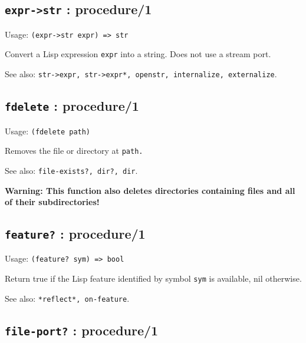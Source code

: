 \documentclass[
]{article}
\newcommand{\passthrough}[1]{#1}
\begin{document}
\hypertarget{expr-str-procedure1-1}{%
\subsection{\texorpdfstring{\texttt{expr-\textgreater{}str} :
procedure/1}{expr-\textgreater str : procedure/1}}\label{expr-str-procedure1-1}}

Usage: \passthrough{\lstinline!(expr->str expr) => str!}

Convert a Lisp expression \passthrough{\lstinline!expr!} into a string.
Does not use a stream port.

See also:
\passthrough{\lstinline!str->expr, str->expr*, openstr, internalize, externalize!}.

\hypertarget{fdelete-procedure1-1}{%
\subsection{\texorpdfstring{\texttt{fdelete} :
procedure/1}{fdelete : procedure/1}}\label{fdelete-procedure1-1}}

Usage: \passthrough{\lstinline!(fdelete path)!}

Removes the file or directory at \passthrough{\lstinline!path.!}

See also: \passthrough{\lstinline!file-exists?, dir?, dir!}.

\textbf{Warning: This function also deletes directories containing files
and all of their subdirectories!}

\hypertarget{feature-procedure1-1}{%
\subsection{\texorpdfstring{\texttt{feature?} :
procedure/1}{feature? : procedure/1}}\label{feature-procedure1-1}}

Usage: \passthrough{\lstinline!(feature? sym) => bool!}

Return true if the Lisp feature identified by symbol
\passthrough{\lstinline!sym!} is available, nil otherwise.

See also: \passthrough{\lstinline!*reflect*, on-feature!}.

\hypertarget{file-port-procedure1-1}{%
\subsection{\texorpdfstring{\texttt{file-port?} :
procedure/1}{file-port? : procedure/1}}\label{file-port-procedure1-1}}
\end{document}
